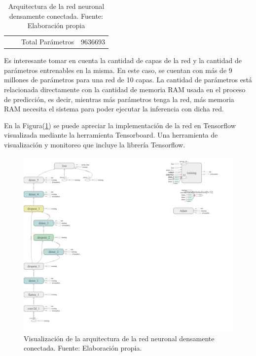 \begin{table}[]
{\begin{tabular}{@{}cccccc@{}}
                                                & \multicolumn{1}{c|}{}              & \multicolumn{2}{c|}{Total Parámetros}                                                                                                                                                       & \multicolumn{2}{c|}{9636693}                                                                                                                                                                     \\ \cmidrule(l){3-6} 
            \end{tabular}%
            }
            \caption[Arquitectura de la red neuronal densamente conectada.]{Arquitectura de la red neuronal densamente conectada. Fuente: Elaboración propia}
            \label{tbl:arqdense}
        \end{table}

        Es interesante tomar en cuenta la cantidad de capas de la red y la cantidad de parámetros entrenables en la misma. En 
        este caso, se cuentan con más de 9 millones de parámetros para una red de 10 capas. La cantidad de parámetros 
        está relacionada directamente con la cantidad de memoria RAM usada en el proceso de predicción, es decir, mientras 
        más parámetros tenga la red, más memoria RAM necesita el sistema para poder ejecutar la inferencia con dicha red.

        En la Figura(\ref{fig:arqdense}) se puede apreciar la implementación de la red en Tensorflow visualizada mediante la herramienta 
        Tensorboard. Una herramienta de visualización y monitoreo que incluye la librería Tensorflow.

        \begin{figure}[!ht] 
            \centering
            \includegraphics[width=\textwidth]{img/arqdense}
            \caption[Arquitectura de la red neuronal densamente conectada]{Visualización de la arquitectura de la red neuronal densamente conectada. Fuente: Elaboración propia. }
            \label{fig:arqdense}
        \end{figure}

